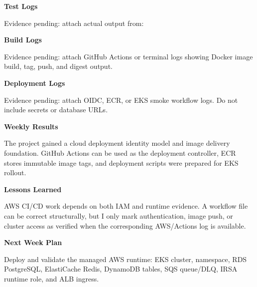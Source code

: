 \vspace{0.5em}\noindent\textbf{Test Logs}\par

Evidence pending: attach actual output from:

\begin{Shaded}
\begin{Highlighting}[]
\end{Highlighting}
\end{Shaded}

\vspace{0.5em}\noindent\textbf{Build Logs}\par

Evidence pending: attach GitHub Actions or terminal logs showing Docker
image build, tag, push, and digest output.

\vspace{0.5em}\noindent\textbf{Deployment Logs}\par

Evidence pending: attach OIDC, ECR, or EKS smoke workflow logs. Do not
include secrets or database URLs.

\vspace{0.5em}\noindent\textbf{Weekly Results}\par

The project gained a cloud deployment identity model and image delivery
foundation. GitHub Actions can be used as the deployment controller, ECR
stores immutable image tags, and deployment scripts were prepared for
EKS rollout.

\vspace{0.5em}\noindent\textbf{Lessons Learned}\par

AWS CI/CD work depends on both IAM and runtime evidence. A workflow file
can be correct structurally, but I only mark authentication, image push,
or cluster access as verified when the corresponding AWS/Actions log is
available.

\vspace{0.5em}\noindent\textbf{Next Week Plan}\par

Deploy and validate the managed AWS runtime: EKS cluster, namespace, RDS
PostgreSQL, ElastiCache Redis, DynamoDB tables, SQS queue/DLQ, IRSA
runtime role, and ALB ingress.
